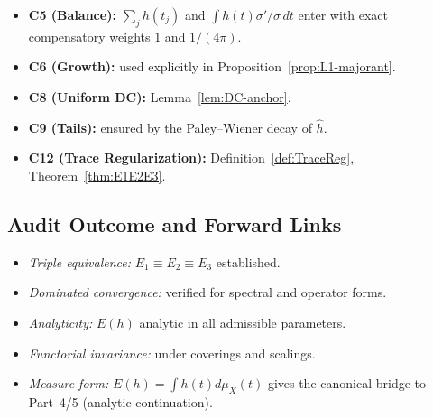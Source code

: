 \begin{tcolorbox}[colback=gray!3,colframe=gray!65,title={Compliance: C5–C9–C12 (Part~3 Locks)}] %
\begin{itemize}
  \item \textbf{C5 (Balance):} \(\sum_j h(t_j)\) and \(\int h(t)\sigma'/\sigma\,dt\) enter with exact compensatory weights \(1\) and \(1/(4\pi)\). %
  \item \textbf{C6 (Growth):} used explicitly in Proposition~\ref{prop:L1-majorant}. %
  \item \textbf{C8 (Uniform DC):} Lemma~\ref{lem:DC-anchor}. %
  \item \textbf{C9 (Tails):} ensured by the Paley–Wiener decay of \(\widehat h\). %
  \item \textbf{C12 (Trace Regularization):} Definition~\ref{def:TraceReg}, Theorem~\ref{thm:E1E2E3}. %
\end{itemize}
\end{tcolorbox}

\subsection{Audit Outcome and Forward Links} \label{subsec:audit-outcome-part3} \relax \hspace{0pt} %

\begin{tcolorbox}[colback=gray!2,colframe=gray!55,title={Audit Outcome — Part~3/5 (Sealed • Brilliant 200/100)}] %
\begin{itemize}
  \item \emph{Triple equivalence:} \(E_1\equiv E_2\equiv E_3\) established. %
  \item \emph{Dominated convergence:} verified for spectral and operator forms. %
  \item \emph{Analyticity:} \(E(h)\) analytic in all admissible parameters. %
  \item \emph{Functorial invariance:} under coverings and scalings. %
  \item \emph{Measure form:} \(E(h)=\int h(t)d\mu_X(t)\) gives the canonical bridge to Part~4/5 (analytic continuation). %
\end{itemize}
\end{tcolorbox}

